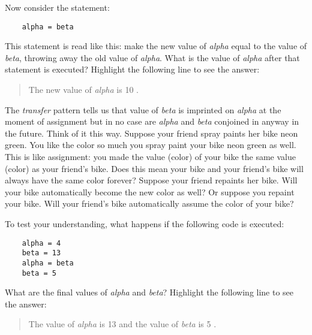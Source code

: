 Now consider the statement:

\color{CodeGreen}
\begin{codesize}
\begin{verbatim}
    alpha = beta
\end{verbatim}
\end{codesize}
\color{black}

This statement is read like this:
make the new value of {\it alpha} equal to the value
of {\it beta}, throwing away the old value of {\it alpha}.
What is the value of {\it alpha} after that statement
is executed?
\W Highlight the following line to see the answer:

\begin{quote}
    The new value of {\it alpha} is 
    {
    \T\color{black}
    \W\color{white}
    10
    }.
\end{quote}

The {\it transfer} pattern tells us that value of {\it beta} is
imprinted on {\it alpha} at the moment of assignment
but in no case are {\it alpha} and {\it beta} conjoined in anyway in
the future. Think of it this way. Suppose your friend
spray paints her bike neon green. You like the color
so much you spray paint your bike neon green as well.
This is like assignment: you made the value (color) of
your bike the same value (color) as your friend's bike.
Does this mean your bike and your friend's bike will
always have the same color forever? Suppose your friend
repaints her bike. Will your bike automatically become
the new color as well? Or suppose you repaint your bike.
Will your friend's bike automatically assume the color
of your bike?

To test your understanding, what happens if the following
code is executed:

\color{CodeGreen}
\begin{codesize}
\begin{verbatim}
    alpha = 4
    beta = 13
    alpha = beta
    beta = 5
\end{verbatim}
\end{codesize}
\color{black}

What are the final values of {\it alpha}  and {\it beta}?
\W Highlight the following line to see the answer:

\begin{quote}
    The value of {\it alpha} is 
    {
    \T\color{black}
    \W\color{white}
    13
    }
    and the value of {\it beta} is 
    {
    \T\color{black}
    \W\color{white}
    5
    }.
\end{quote}

